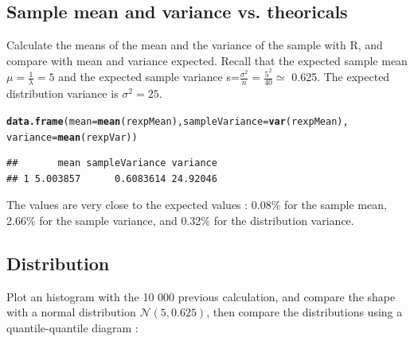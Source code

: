 \documentclass[a4paper, 10pt]{article}\usepackage[]{graphicx}\usepackage[]{color}
\makeatletter
\newcommand{\hlstd}[1]{\textcolor[rgb]{0.345,0.345,0.345}{#1}}%
\newcommand{\hlkwc}[1]{\textcolor[rgb]{0.333,0.667,0.333}{#1}}%
\newcommand{\hlkwd}[1]{\textcolor[rgb]{0.737,0.353,0.396}{\textbf{#1}}}%
\newenvironment{kframe}{%
 \def\at@end@of@kframe{}%
 \ifinner\ifhmode%
  \def\at@end@of@kframe{\end{minipage}}%
  \begin{minipage}{\columnwidth}%
 \fi\fi%
 \def\FrameCommand##1{\hskip\@totalleftmargin \hskip-\fboxsep
 \colorbox{shadecolor}{##1}\hskip-\fboxsep
     \hskip-\linewidth \hskip-\@totalleftmargin \hskip\columnwidth}%
 \MakeFramed {\advance\hsize-\width
   \@totalleftmargin\z@ \linewidth\hsize
   \@setminipage}}%
 {\par\unskip\endMakeFramed%
 \at@end@of@kframe}
\newenvironment{knitrout}{}{} %
\makeatother
\begin{document}
\subsection{Sample mean and variance vs. theoricals}

Calculate the means of the mean and the variance of the sample with R, and compare with mean and variance expected.
Recall that the expected sample mean $\mu=\frac{1}{\lambda}=5$ and the expected sample variance s=$\frac{\sigma^2}{n}=\frac{5^2}{40} \simeq$ 0.625. The expected distribution variance is $\sigma^2=25$.

\begin{knitrout}\small
{}\color{fgcolor}\begin{kframe}
\begin{alltt}
\hlkwd{data.frame}\hlstd{(}\hlkwc{mean}\hlstd{=}\hlkwd{mean}\hlstd{(rexpMean),} \hlkwc{sampleVariance}\hlstd{=}\hlkwd{var}\hlstd{(rexpMean),}
           \hlkwc{variance}\hlstd{=}\hlkwd{mean}\hlstd{(rexpVar))}
\end{alltt}
\begin{verbatim}
##       mean sampleVariance variance
## 1 5.003857      0.6083614 24.92046
\end{verbatim}
\end{kframe}
\end{knitrout}

The values are very close to the expected values : 
0.08\% for the sample mean, 
2.66\% for the sample variance, and 
0.32\% for the distribution variance.

\subsection{Distribution}

Plot an histogram with the 10 000 previous calculation, and compare the shape with a normal distribution $\mathcal{N}(5,0.625)$, then compare the distributions using a quantile-quantile diagram :
\end{document}
